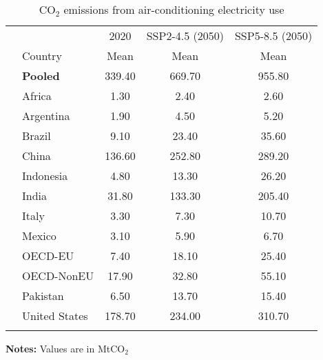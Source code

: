 \begin{table}[H]
\centering\renewcommand*{\arraystretch}{1.1}
\caption{CO$_2$ emissions from air-conditioning electricity use}
\label{tab:emissions}
\begin{threeparttable}
\begin{tabular}[H]{llccc}
\toprule
\multicolumn{2}{c}{ } & \multicolumn{1}{c}{2020} & \multicolumn{1}{c}{SSP2-4.5 (2050)} & \multicolumn{1}{c}{SSP5-8.5 (2050)} \\
\cmidrule(l{3pt}r{3pt}){3-3} \cmidrule(l{3pt}r{3pt}){4-4} \cmidrule(l{3pt}r{3pt}){5-5}
  & Country & Mean & Mean & Mean\\
\midrule\addlinespace
 & \textbf{Pooled} & \num{339.40} & \num{669.70} & \num{955.80}\\ \midrule \addlinespace
 & Africa & \num{1.30} & \num{2.40} & \num{2.60}\\
 & Argentina & \num{1.90} & \num{4.50} & \num{5.20}\\
 & Brazil & \num{9.10} & \num{23.40} & \num{35.60}\\
 & China & \num{136.60} & \num{252.80} & \num{289.20}\\
 & Indonesia & \num{4.80} & \num{13.30} & \num{26.20}\\
 & India & \num{31.80} & \num{133.30} & \num{205.40}\\
 & Italy & \num{3.30} & \num{7.30} & \num{10.70}\\
 & Mexico & \num{3.10} & \num{5.90} & \num{6.70}\\
 & OECD-EU & \num{7.40} & \num{18.10} & \num{25.40}\\
 & OECD-NonEU & \num{17.90} & \num{32.80} & \num{55.10}\\
 & Pakistan & \num{6.50} & \num{13.70} & \num{15.40}\\
 & United States & \num{178.70} & \num{234.00} & \num{310.70}\\\addlinespace
\bottomrule
\end{tabular}
\begin{tablenotes}
    \item \footnotesize \textbf{Notes:} Values are in MtCO$_2$
\end{tablenotes}
\end{threeparttable}
\end{table}

